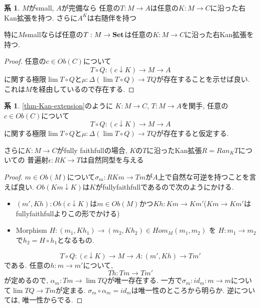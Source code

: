 \documentclass[dvipdfmx,a4paper,11pt]{article}
\theoremstyle{definition}
\newtheorem{cor}[thm]{系}
\begin{document}
 \begin{tcolorbox}
 [colback = white, colframe = green!35!black, fonttitle = \bfseries,breakable = true]
\begin{cor}
$M$がsmall, $A$が完備なら
任意の$T : M \to A$は任意の$K : M \to C$に沿った右Kan拡張を持つ. 
さらに$A^K$は右随伴を持つ

特に$M$smallならば任意の$T : M \to {\bf Set}$は任意の$K : M \to C$に沿った右Kan拡張を持つ. 
\end{cor}
\end{tcolorbox}

\begin{proof}
任意の$c \in Ob(C)$について
$$
T \circ Q : (c \downarrow K) \to M \to A
$$
に関する極限$\lim T\circ Q$と$\mu: \Delta (\lim T\circ Q) \to TQ$が存在することを示せば良い.
これは$M$を経由しているので存在する.

\end{proof}

 \begin{tcolorbox}
 [colback = white, colframe = green!35!black, fonttitle = \bfseries,breakable = true]
\begin{cor}
\ref{thm-Kan-extension}のように
$K : M \to C$, $T : M \to A$を関手, 
任意の$c \in Ob(C)$について
$$
T \circ Q : (c \downarrow K) \to M \to A
$$
に関する極限$\lim T\circ Q$と$\mu: \Delta (\lim T\circ Q) \to TQ$が存在すると仮定する.

さらに$K : M \to C$がfully faithfullの場合, 
$K$の$T$に沿ったKan拡張$R = Ran_{K}T$についての
普遍射$\epsilon : RK \to T$は自然同型を与える
\end{cor}
\end{tcolorbox}

\begin{proof}
$m \in Ob(M)$について$\sigma_m : RKm \to Tm$が$A$上で自然な可逆を持つことを言えば良い. 
$Ob(Km \downarrow K)$は$K$がfullyfaithfullであるので次のようにかける.
\begin{itemize}
\item $(m', Kh) : Ob(c \downarrow K)$は$m \in Ob(M)$かつ$Kh : Km \to Km'$($Km \to Km'$はfullyfaithfullよりこの形でかける) %
\item Morphism $H : (m_1, Kh_1)  \to (m_2,Kh_2) \in Hom_{M}(m_1,m_2) $ を 
$H: m_1 \to m_2$で$ h_2 = H \circ h_1 $となるもの.
\end{itemize}
$$
T \circ Q : (c \downarrow K) \to M \to A : (m' , Kh) \to Tm'
$$
である. 任意の$h : m \to m'$について, 
$$
Th : Tm \to Tm' 
$$
が定めるので, $\alpha_m :  Tm \to \lim TQ$が唯一存在する. 
一方で$\sigma_m : id_{m} : m \to m$について$\lim TQ \to Tm$が定まる.
$\sigma_m \circ \alpha_m = id_m$は唯一性のところから明らか. 
逆については, 唯一性からでる. 
\end{proof}
\end{document}
